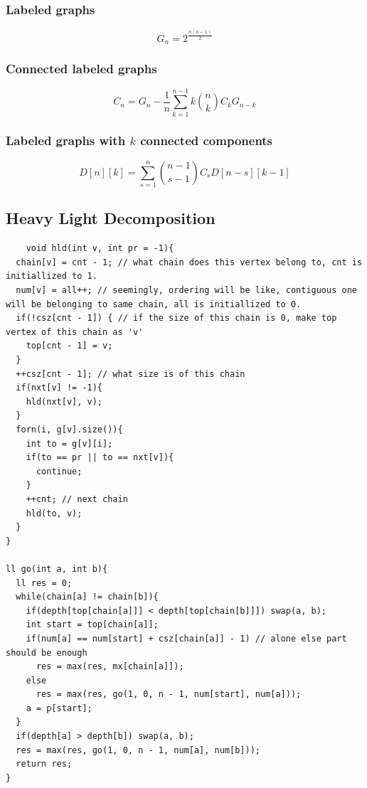 \documentclass[8pt, a4paper, oneside, twocolumn]{extarticle}
\begin{document}
\subsubsection{Labeled graphs}
$$G_n = 2^{\frac{n(n-1)}{2}}$$
\subsubsection{Connected labeled graphs}
$$C_n = G_n - \frac{1}{n} \sum_{k=1}^{n-1} k \binom{n}{k} C_k G_{n-k}$$
\subsubsection{Labeled graphs with $k$ connected components}
$$D[n][k] = \sum_{s=1}^{n} \binom{n-1}{s-1} C_s D[n-s][k-1]$$
\subsection{Heavy Light Decomposition}
\begin{verbatim}
    void hld(int v, int pr = -1){
  chain[v] = cnt - 1; // what chain does this vertex belong to, cnt is initiallized to 1.
  num[v] = all++; // seemingly, ordering will be like, contiguous one will be belonging to same chain, all is initiallized to 0.
  if(!csz[cnt - 1]) { // if the size of this chain is 0, make top vertex of this chain as 'v'
    top[cnt - 1] = v;
  }
  ++csz[cnt - 1]; // what size is of this chain
  if(nxt[v] != -1){
    hld(nxt[v], v);
  }
  forn(i, g[v].size()){
    int to = g[v][i];
    if(to == pr || to == nxt[v]){
      continue;
    }
    ++cnt; // next chain
    hld(to, v);
  }
}

ll go(int a, int b){
  ll res = 0;
  while(chain[a] != chain[b]){
    if(depth[top[chain[a]]] < depth[top[chain[b]]]) swap(a, b);
    int start = top[chain[a]];
    if(num[a] == num[start] + csz[chain[a]] - 1) // alone else part should be enough
      res = max(res, mx[chain[a]]);
    else
      res = max(res, go(1, 0, n - 1, num[start], num[a]));
    a = p[start];
  }
  if(depth[a] > depth[b]) swap(a, b);
  res = max(res, go(1, 0, n - 1, num[a], num[b]));
  return res;
}
\end{verbatim}
\end{document}
